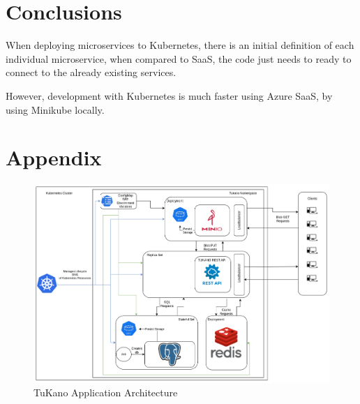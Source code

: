 \documentclass[10pt,a4paper,twocolumn]{article}
\begin{document}
\section {Conclusions}
\label{sec:Conc}
\par When deploying microservices to Kubernetes, there is an initial definition of each individual microservice, when compared to SaaS, the code just needs to ready to connect to the already existing services.
\par However, development with Kubernetes is much faster using Azure SaaS, by using Minikube locally.

\appendix
\section{Appendix}
\begin{figure}[h]
  \centering
  \includegraphics[width=\textwidth]{images/TuKanoArch.png}
  \caption{TuKano Application Architecture}
  \label{fig:tukano_architecture}
\end{figure}



\end{document}
